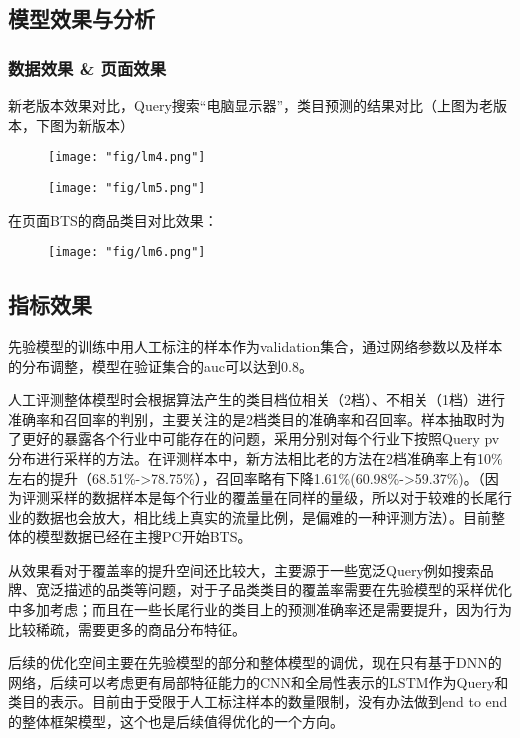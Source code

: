 \subsection{模型效果与分析}

\subsubsection{数据效果 \& 页面效果}	
新老版本效果对比，Query搜索“电脑显示器”，类目预测的结果对比（上图为老版本，下图为新版本）
\begin{figure}[!h]
	\centering
	\texttt{[image: "fig/lm4.png"]}
	\caption{}
	\label{fig:lm4}
\end{figure}

\begin{figure}[!h]
	\centering
	\texttt{[image: "fig/lm5.png"]}
	\caption{}
	\label{fig:lm5}
\end{figure}
在页面BTS的商品类目对比效果：
\begin{figure}[!h]
	\centering
	\texttt{[image: "fig/lm6.png"]}
	\caption{}
	\label{fig:lm6}
\end{figure}

\subsection{指标效果}
先验模型的训练中用人工标注的样本作为validation集合，通过网络参数以及样本的分布调整，模型在验证集合的auc可以达到0.8。
\par 人工评测整体模型时会根据算法产生的类目档位相关（2档）、不相关（1档）进行准确率和召回率的判别，主要关注的是2档类目的准确率和召回率。样本抽取时为了更好的暴露各个行业中可能存在的问题，采用分别对每个行业下按照Query pv分布进行采样的方法。在评测样本中，新方法相比老的方法在2档准确率上有10\%左右的提升（68.51\%->78.75\%），召回率略有下降1.61\%(60.98\%->59.37\%)。（因为评测采样的数据样本是每个行业的覆盖量在同样的量级，所以对于较难的长尾行业的数据也会放大，相比线上真实的流量比例，是偏难的一种评测方法）。目前整体的模型数据已经在主搜PC开始BTS。
\par 从效果看对于覆盖率的提升空间还比较大，主要源于一些宽泛Query例如搜索品牌、宽泛描述的品类等问题，对于子品类类目的覆盖率需要在先验模型的采样优化中多加考虑；而且在一些长尾行业的类目上的预测准确率还是需要提升，因为行为比较稀疏，需要更多的商品分布特征。
\par 后续的优化空间主要在先验模型的部分和整体模型的调优，现在只有基于DNN的网络，后续可以考虑更有局部特征能力的CNN和全局性表示的LSTM作为Query和类目的表示。目前由于受限于人工标注样本的数量限制，没有办法做到end to end的整体框架模型，这个也是后续值得优化的一个方向。


